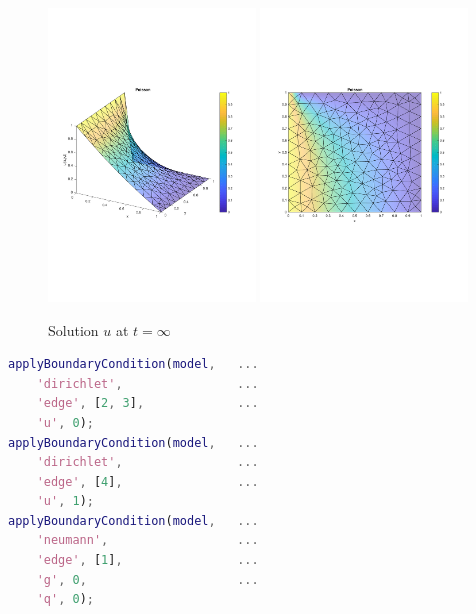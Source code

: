 \documentclass[11pt, a4paper]{article}
\begin{document}
\begin{figure}
  \includegraphics[width=0.49\textwidth]{assets/solution_3d.pdf}
  \includegraphics[width=0.49\textwidth]{assets/solution_xy.pdf}
  \caption{Solution $u$ at $t=\infty$}\label{fig:solution}
\end{figure}

\begin{lstlisting}[language=Matlab]
%% Boundary conditions
applyBoundaryCondition(model,	...
    'dirichlet',                ...
    'edge', [2, 3],             ...
    'u', 0);
applyBoundaryCondition(model,	...
    'dirichlet',                ...
    'edge', [4],                ...
    'u', 1);
applyBoundaryCondition(model,	...
    'neumann',                  ...
    'edge', [1],                ...
    'g', 0,                     ...
    'q', 0); 
\end{lstlisting}
\end{document}
